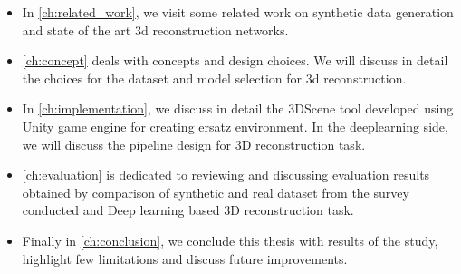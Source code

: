 \begin{itemize}
    \item In \autoref{ch:related_work}, we visit some related work on synthetic data generation and state of the art 3d reconstruction networks.
    \item \autoref{ch:concept} deals with concepts and design choices.
    We will discuss in detail the choices for the dataset and model selection for 3d reconstruction.
    \item In \autoref{ch:implementation}, we discuss in detail the 3DScene tool developed using Unity game engine for creating ersatz environment.
    In the deeplearning side, we will discuss the pipeline design for 3D reconstruction task.
    \item \autoref{ch:evaluation} is dedicated to reviewing and discussing evaluation results obtained by comparison of synthetic and real dataset from the survey conducted and Deep learning based 3D reconstruction task.
    \item Finally in \autoref{ch:conclusion}, we conclude this thesis with results of the study, highlight few limitations and discuss future improvements.
\end{itemize}